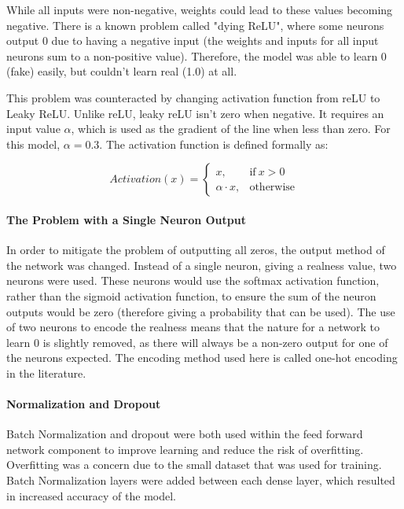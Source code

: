 \documentclass[10pt,a4paper]{article}
\begin{document}
                While all inputs were non-negative, weights could lead to these values becoming negative. There is a known problem called "dying ReLU", where some neurons output 0
                due to having a negative input (the weights and inputs for all input neurons sum to a non-positive value). Therefore, the model was able to learn 0 (fake) easily, but
                couldn't learn real (1.0) at all. \cite{liu_liu_2017}

                This problem was counteracted by changing activation function from reLU to Leaky ReLU. Unlike reLU, leaky reLU isn't zero when negative. It requires an input value $\alpha$, which is used
                as the gradient of the line when less than zero. \cite{liu_liu_2017} For this model, $\alpha=0.3$. The activation function is defined formally as:
                
                \begin{equation}
                    Activation(x) =
                    \begin{cases}
                    x, & \text{if}\ x>0 \\
                    \alpha \cdot x, & \text{otherwise}
                    \end{cases}
                \end{equation}

                \paragraph{The Problem with a Single Neuron Output}
                In order to mitigate the problem of outputting all zeros, the output method of the network was changed. Instead of a single neuron, giving a realness value, two neurons were used.
                These neurons would use the softmax activation function, rather than the sigmoid activation function, to ensure the sum of the neuron outputs would be zero (therefore giving a probability that can be used).
                The use of two neurons to encode the realness means that the nature for a network to learn 0 is slightly removed, as there will always be a non-zero output for one of the neurons expected. The encoding method used here
                is called one-hot encoding in the literature.

                \paragraph{Normalization and Dropout}
                Batch Normalization and dropout were both used within the feed forward network component to improve learning and reduce the risk of overfitting. Overfitting was a concern due to the small dataset that was used for training.
                Batch Normalization layers were added between each dense layer, which resulted in increased accuracy of the model.
\end{document}

